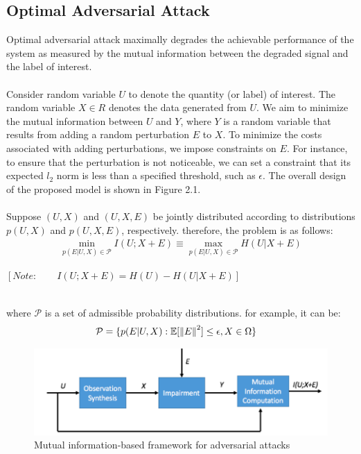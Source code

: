 \documentclass[paper=a4, fontsize=11pt]{scrartcl}
\numberwithin{equation}{section}		%
\numberwithin{figure}{section}			%
\numberwithin{table}{section}				%
\begin{document}
\subsection{Optimal Adversarial Attack}
Optimal adversarial attack maximally degrades the achievable performance of the system as measured by the mutual information between the degraded signal and the label of interest.\\
\\
Consider random variable $U$ to denote the quantity (or label) of interest. The random variable $X \in R$ denotes the data generated from $U$. 
We aim to minimize the mutual information between $U$ and $Y$, where $Y$ is a random variable that results from adding a random perturbation $E$ to $X$. To minimize the costs associated with adding perturbations, we impose constraints on $E$. For instance, to ensure that the perturbation is not noticeable, we can set a constraint that its expected $l_2$ norm is less than a specified threshold, such as $\epsilon$. The overall design of the proposed model is shown in Figure 2.1.
\\
\\
Suppose $(U, X)$ and $(U, X, E)$ be jointly distributed according to distributions $p(U, X)$ and $p(U, X, E)$, respectively. therefore, the problem is as follows:
\begin{align}
\min_{p(E|U,X)\in \mathcal{P}} I(U;X+E) \equiv \max_{p(E|U,X)\in \mathcal{P}} H(U|X+E)
\end{align}
\begin{center}
    $[Note: \qquad I(U;X+E) = H(U) - H(U|X+E)]$
\end{center}

\\
where $\mathcal{P}$ is a set of admissible probability distributions.
\newline
for example, it can be:
\begin{align}
\mathcal{P} &= \{p(E|U,X): \mathbb{E}[\left\lVert E\right\rVert^2] \leq \epsilon, X \in \Omega\}
\end{align}


\begin{figure}
\centering
\includegraphics[width=0.8\columnwidth]{first paper.png}
\caption{Mutual information-based framework for adversarial attacks}
\end{figure}
\end{document}
